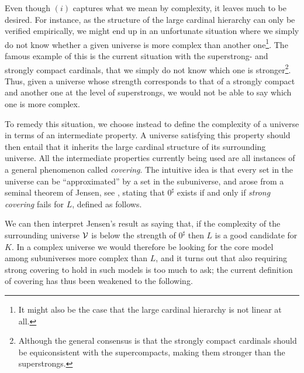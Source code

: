 \documentclass[../../main]{subfiles}
\begin{document}
Even though $(i)$ captures what we mean by complexity, it leaves much to be desired. For instance, as the structure of the large cardinal hierarchy can only be verified empirically, we might end up in an unfortunate situation where we simply do not know whether a given universe is more complex than another one\footnote{It might also be the case that the large cardinal hierarchy is not linear at all.}. The famous example of this is the current situation with the superstrong- and strongly compact cardinals, that we simply do not know which one is stronger\footnote{Although the general consensus is that the strongly compact cardinals should be equiconsistent with the supercompacts, making them stronger than the superstrongs.}. Thus, given a universe whose strength corresponds to that of a strongly compact and another one at the level of superstrongs, we would not be able to say which one is more complex. 

\qquad To remedy this situation, we choose instead to define the complexity of a universe in terms of an intermediate property. A universe satisfying this property should then entail that it inherits the large cardinal structure of its surrounding universe. All the intermediate properties currently being used are all instances of a general phenomenon called \textit{covering}. The intuitive idea is that every set in the universe can be ``approximated'' by a set in the subuniverse, and arose from a seminal theorem of Jensen, see \cite[Theorem 11.56]{SchindlerBook}, stating that $0^\sharp$ exists if and only if \textit{strong covering} fails for $L$, defined as follows.


We can then interpret Jensen's result as saying that, if the complexity of the surrounding universe $\operatorname{\mathcal V}$ is below the strength of $0^\sharp$ then $L$ is a good candidate for $K$. In a complex universe we would therefore be looking for the core model among subuniverses more complex than $L$, and it turns out that also requiring strong covering to hold in such models is too much to ask; the current definition of covering has thus been weakened to the following.

\end{document}
